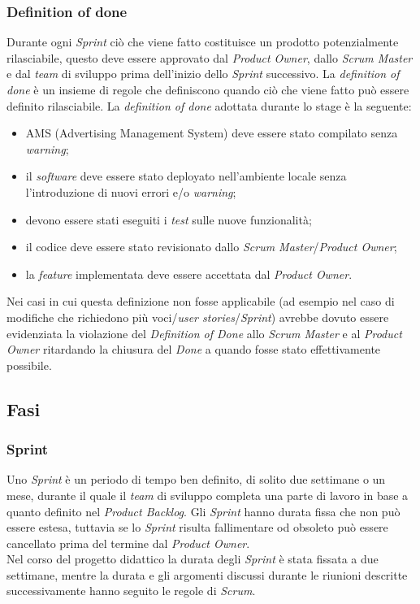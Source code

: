 \subsubsection{Definition of done}
Durante ogni \textit{Sprint} ciò che viene fatto costituisce un prodotto potenzialmente rilasciabile, questo deve essere approvato dal \textit{Product Owner}, dallo \textit{Scrum Master} e dal \textit{team} di sviluppo prima dell'inizio dello \textit{Sprint} successivo. La \textit{definition of done} è un insieme di regole che definiscono quando ciò che viene fatto può essere definito rilasciabile.
La \textit{definition of done} adottata durante lo stage è la seguente:
\begin{itemize}
    \item AMS (Advertising Management System) deve essere stato compilato senza \textit{warning};
    \item il \textit{software} deve essere stato deployato nell’ambiente locale senza l'introduzione di nuovi errori e/o \textit{warning};
    \item devono essere stati eseguiti i \textit{test} sulle nuove funzionalità;
    \item il codice deve essere stato revisionato dallo \textit{Scrum Master}/\textit{Product Owner};
    \item la \textit{feature} implementata deve essere accettata dal \textit{Product Owner}.
\end{itemize}
Nei casi in cui questa definizione non fosse applicabile (ad esempio nel caso di modifiche che richiedono più voci/\textit{user stories}/\textit{Sprint}) avrebbe dovuto essere evidenziata la violazione del \textit{Definition of Done} allo \textit{Scrum Master} e al \textit{Product Owner} ritardando la chiusura del \textit{Done} a quando fosse stato effettivamente possibile.



\subsection{Fasi}

\subsubsection{Sprint}
Uno \textit{Sprint} è un periodo di tempo ben definito, di solito due settimane o un mese, durante il quale il \textit{team} di sviluppo completa una parte di lavoro in base a quanto definito nel \textit{Product Backlog}.
Gli \textit{Sprint} hanno durata fissa che non può essere estesa, tuttavia se lo \textit{Sprint} risulta fallimentare od obsoleto può essere cancellato prima del termine dal \textit{Product Owner}.
\\Nel corso del progetto didattico la durata degli \textit{Sprint} è stata fissata a due settimane, mentre la durata e gli argomenti discussi durante le riunioni descritte successivamente hanno seguito le regole di \textit{Scrum}.

